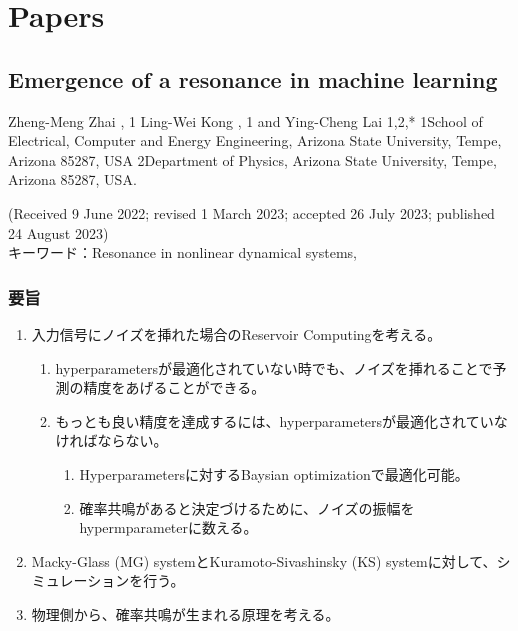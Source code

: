 \section{Papers}
\subsection{Emergence of a resonance in machine learning}
Zheng-Meng Zhai , 1 Ling-Wei Kong , 1 and Ying-Cheng Lai 1,2,*
1School of Electrical, Computer and Energy Engineering, Arizona State University, Tempe, Arizona 85287, USA
2Department of Physics, Arizona State University, Tempe, Arizona 85287, USA.

\noindent (Received 9 June 2022; revised 1 March 2023; accepted 26 July 2023; published 24 August 2023)
\\

\noindent キーワード：Resonance in nonlinear dynamical systems, 

\subsubsection{要旨}

\begin{enumerate}
  \item 入力信号にノイズを挿れた場合のReservoir Computingを考える。\begin{enumerate}
    \item hyperparametersが最適化されていない時でも、ノイズを挿れることで予測の精度をあげることができる。
    \item もっとも良い精度を達成するには、hyperparametersが最適化されていなければならない。\begin{enumerate}
      \item Hyperparametersに対するBaysian optimizationで最適化可能。
      \item 確率共鳴があると決定づけるために、ノイズの振幅をhypermparameterに数える。
    \end{enumerate}
  \end{enumerate} 
  \item Macky-Glass (MG) systemとKuramoto-Sivashinsky (KS) systemに対して、シミュレーションを行う。
  \item 物理側から、確率共鳴が生まれる原理を考える。
\end{enumerate}
\clearpage

